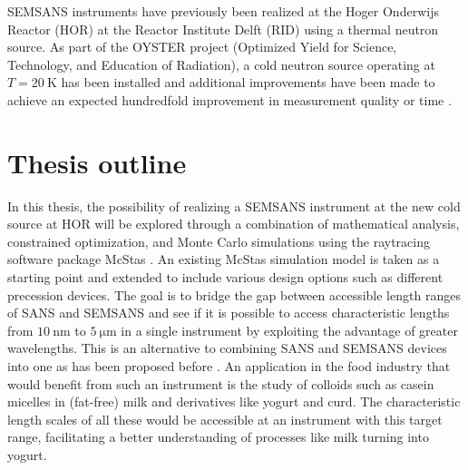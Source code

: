 SEMSANS instruments have previously been realized at the Hoger Onderwijs Reactor (HOR) at the Reactor Institute Delft (RID) using a thermal neutron source. As part of the OYSTER project (Optimized Yield for Science, Technology, and Education of Radiation), a cold neutron source operating at $T=\SI{20}{\kelvin}$ has been installed and additional improvements have been made to achieve an expected hundredfold improvement in measurement quality or time \cite{OYSTER2008}.

\section{Thesis outline}
In this thesis, the possibility of realizing a SEMSANS instrument at the new cold source at HOR will be explored through a combination of mathematical analysis, constrained optimization, and Monte Carlo simulations using the raytracing software package McStas \cite{willendrup2020}. An existing McStas simulation model \cite{bouwman2021b} is taken as a starting point and extended to include various design options such as different precession devices. 
The goal is to bridge the gap between accessible length ranges of SANS and SEMSANS \cite{bouwman2021} and see if it is possible to access characteristic lengths from $\SI{10}{\nano\meter}$ to $\SI{5}{\micro\meter}$ in a single instrument by exploiting the advantage of greater wavelengths. This is an alternative to combining SANS and SEMSANS devices into one as has been proposed before \cite{bouwman2011}\cite{kusmin2017}. An application in the food industry that would benefit from such an instrument is the study of colloids such as casein micelles in (fat-free) milk and derivatives like yogurt and curd. The characteristic length scales of all these would be accessible at an instrument with this target range, facilitating a better understanding of processes like milk turning into yogurt. 